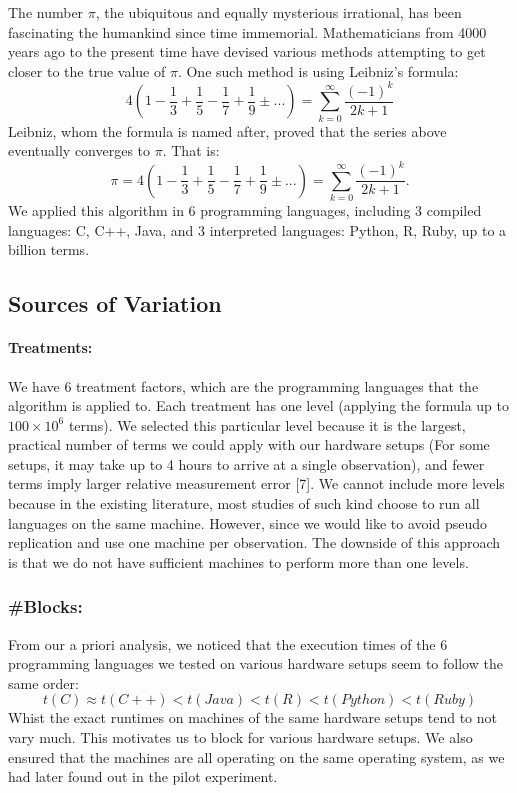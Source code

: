 \documentclass[12pt,halfline,a4paper,]{ouparticle}
\begin{document}
The number \(\pi\), the ubiquitous and equally mysterious irrational,
has been fascinating the humankind since time immemorial. Mathematicians
from 4000 years ago to the present time have devised various methods
attempting to get closer to the true value of \(\pi\). One such method
is using Leibniz's formula: \[
4 \left( 1 - \frac{1}{3} + \frac{1}{5} - \frac{1}{7} + \frac{1}{9} ±... \right) = \sum_{k=0}^{\infty}\frac{(-1)^k}{2k+1}
\] Leibniz, whom the formula is named after, proved that the series
above eventually converges to \(\pi\). That is: \[
\pi = 4 \left( 1 - \frac{1}{3} + \frac{1}{5} - \frac{1}{7} + \frac{1}{9} ±... \right) = \sum_{k=0}^{\infty}\frac{(-1)^k}{2k+1}.
\] We applied this algorithm in 6 programming languages, including 3
compiled languages: C, C++, Java, and 3 interpreted languages: Python,
R, Ruby, up to a billion terms.

\subsection{Sources of Variation}\label{sources-of-variation}

\paragraph{Treatments:}\label{treatments}

We have 6 treatment factors, which are the programming languages that
the algorithm is applied to. Each treatment has one level (applying the
formula up to \(100 \times 10^6\) terms). We selected this particular
level because it is the largest, practical number of terms we could
apply with our hardware setups (For some setups, it may take up to 4
hours to arrive at a single observation), and fewer terms imply larger
relative measurement error {[}7{]}. We cannot include more levels
because in the existing literature, most studies of such kind choose to
run all languages on the same machine. However, since we would like to
avoid pseudo replication and use one machine per observation. The
downside of this approach is that we do not have sufficient machines to
perform more than one levels.

\subsubsection{\#Blocks:}\label{blocks}

From our a priori analysis, we noticed that the execution times of the 6
programming languages we tested on various hardware setups seem to
follow the same order: \begin{equation}
t(C) \approx t(C++) < t(Java) < t(R) < t(Python) < t(Ruby)
\end{equation} Whist the exact runtimes on machines of the same hardware
setups tend to not vary much. This motivates us to block for various
hardware setups. We also ensured that the machines are all operating on
the same operating system, as we had later found out in the pilot
experiment.
\end{document}
